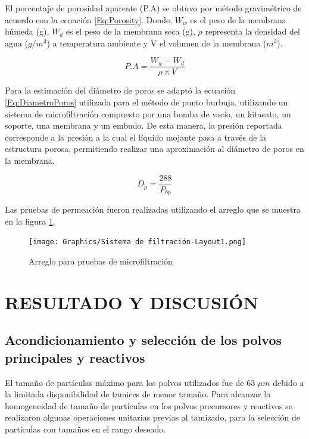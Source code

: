 \documentclass{article}
\begin{document}
El porcentaje de porosidad aparente (P.A) se obtuvo por método gravimétrico de acuerdo con la ecuación \ref{Eq:Porosity}. Donde, $W_w$ es el peso de la membrana húmeda (g), $W_d$ es el peso de la membrana seca (g), $\rho$ representa la densidad del agua ($g/m^3$) a temperatura ambiente y V el volumen de la membrana ($m^3$).

\begin{equation}
    P.A = \frac{W_w-W_d}{\rho \times V}
    \label{Eq:Porosity}
\end{equation}

Para la estimación del diámetro de poros se adaptó la ecuación \ref{Eq:DiametroPoros} utilizada para el método de punto burbuja, utilizando un sistema de microfiltración compuesto por una bomba de vacío, un kitasato, un soporte, una membrana y un embudo. De esta manera, la presión reportada corresponde a la presión a la cual el líquido mojante pasa a través de la estructura porosa, permitiendo realizar una aproximación al diámetro de poros en la membrana. 

\begin{equation}
    D_p = \frac{288}{P_{bp}}
    \label{Eq:DiametroPoros}
\end{equation}

Las pruebas de permeación fueron realizadas utilizando el arreglo que se muestra en la figura \ref{fig:Arreglo_MF}. 

\begin{figure}
    \centering
    \texttt{[image: Graphics/Sistema de filtración-Layout1.png]}
    \caption{Arreglo para pruebas de microfiltración}
    \label{fig:Arreglo_MF}
\end{figure}

\section{RESULTADO Y DISCUSIÓN}
\subsection{Acondicionamiento y selección de los polvos principales y reactivos}

El tamaño de partículas máximo para los polvos utilizados fue de 63 $\mu m$ debido a la limitada disponibilidad de tamices de menor tamaño. Para alcanzar la homogeneidad de tamaño de partículas en los polvos precursores y reactivos se realizaron algunas operaciones unitarias previas al tamizado, para la selección de partículas con tamaños en el rango deseado. 
\end{document}
